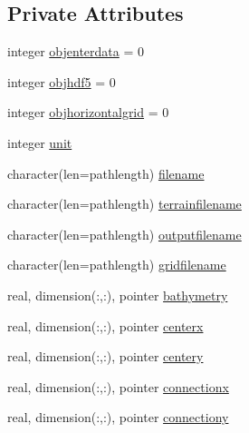 \subsection*{Private Attributes}
\begin{DoxyCompactItemize}
\item 
integer \mbox{\hyperlink{structmodulecalmetformat_1_1t__calmetformat_a0e7cc211b358f7b22a7942747a78734c}{objenterdata}} = 0
\item 
integer \mbox{\hyperlink{structmodulecalmetformat_1_1t__calmetformat_a5c871534f75b78c78cdf0396ecad70e0}{objhdf5}} = 0
\item 
integer \mbox{\hyperlink{structmodulecalmetformat_1_1t__calmetformat_aab254edc32d9a150f1bb60d9ab37517e}{objhorizontalgrid}} = 0
\item 
integer \mbox{\hyperlink{structmodulecalmetformat_1_1t__calmetformat_a252c326c2899a494c4b9d1a411ae9570}{unit}}
\item 
character(len=pathlength) \mbox{\hyperlink{structmodulecalmetformat_1_1t__calmetformat_abfbc4eb89c4ec6c1507a5d46126c6e2b}{filename}}
\item 
character(len=pathlength) \mbox{\hyperlink{structmodulecalmetformat_1_1t__calmetformat_a7c922d0528e920c11c0f16daf932b5e5}{terrainfilename}}
\item 
character(len=pathlength) \mbox{\hyperlink{structmodulecalmetformat_1_1t__calmetformat_a68ded0b7493bddb955bc090d16c4d09b}{outputfilename}}
\item 
character(len=pathlength) \mbox{\hyperlink{structmodulecalmetformat_1_1t__calmetformat_aa94958b4764947e800f25c775a53077d}{gridfilename}}
\item 
real, dimension(\+:,\+:), pointer \mbox{\hyperlink{structmodulecalmetformat_1_1t__calmetformat_a048a1dbd642743581275c4e2637b509e}{bathymetry}}
\item 
real, dimension(\+:,\+:), pointer \mbox{\hyperlink{structmodulecalmetformat_1_1t__calmetformat_ac2c8368368f6165c7b1317e0ac233279}{centerx}}
\item 
real, dimension(\+:,\+:), pointer \mbox{\hyperlink{structmodulecalmetformat_1_1t__calmetformat_aeb82d77fcda5d976df3259f6a6d5ee9a}{centery}}
\item 
real, dimension(\+:,\+:), pointer \mbox{\hyperlink{structmodulecalmetformat_1_1t__calmetformat_a41cd064999237c8f3ef5d6c4cc3516f8}{connectionx}}
\item 
real, dimension(\+:,\+:), pointer \mbox{\hyperlink{structmodulecalmetformat_1_1t__calmetformat_ad57f0acf16a707eed0b70b7920867d33}{connectiony}}

\end{DoxyCompactItemize}
